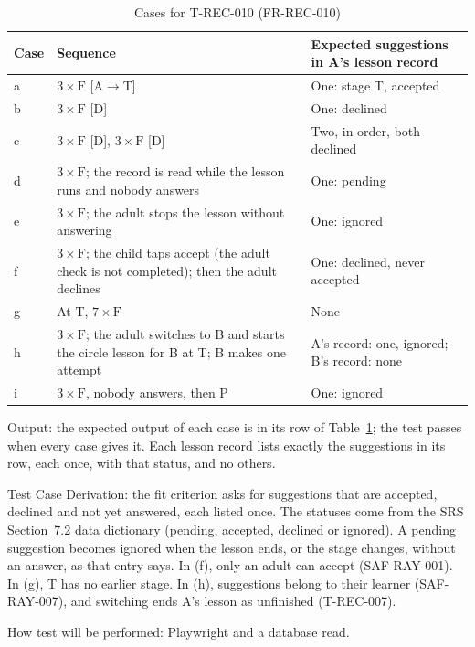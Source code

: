 \documentclass[12pt, titlepage]{article}
\begin{document}
\begin{enumerate}
\begin{table}[htbp]
\centering\small
\caption{Cases for T-REC-010 (FR-REC-010)}
\label{tab:t-rec-010}
\begin{tabularx}{\textwidth}{@{}l >{\raggedright\arraybackslash}X
  >{\raggedright\arraybackslash}X@{}}
\toprule
\textbf{Case} & \textbf{Sequence} &
\textbf{Expected suggestions in A's lesson record}\\
\midrule
a & $3 \times \mathrm{F}$ [A$\to$T] & One: stage T, accepted\\
b & $3 \times \mathrm{F}$ [D] & One: declined\\
c & $3 \times \mathrm{F}$ [D], $3 \times \mathrm{F}$ [D] & Two, in order,
both declined\\
d & $3 \times \mathrm{F}$; the record is read while the lesson runs and
nobody answers & One: pending\\
e & $3 \times \mathrm{F}$; the adult stops the lesson without answering &
One: ignored\\
f & $3 \times \mathrm{F}$; the child taps accept (the adult check is not
completed); then the adult declines & One: declined, never accepted\\
g & At T, $7 \times \mathrm{F}$ & None\\
h & $3 \times \mathrm{F}$; the adult switches to B and starts the circle
lesson for B at T; B makes one attempt & A's record: one, ignored; B's
record: none\\
i & $3 \times \mathrm{F}$, nobody answers, then P & One: ignored\\
\bottomrule
\end{tabularx}
\end{table}

Output: the expected output of each case is in its row of
Table~\ref{tab:t-rec-010}; the test passes when every case gives it. Each
lesson record lists exactly the suggestions in its row, each once, with
that status, and no others.

Test Case Derivation: the fit criterion asks for suggestions that are
accepted, declined and not yet answered, each listed once. The statuses
come from the SRS Section~7.2 data dictionary (pending, accepted, declined
or ignored). A pending suggestion becomes ignored when the lesson ends, or
the stage changes, without an answer, as that entry says. In (f), only an adult can accept (SAF-RAY-001). In (g), T has
no earlier stage. In (h), suggestions belong to their learner
(SAF-RAY-007), and switching ends A's lesson as unfinished (T-REC-007).

How test will be performed: Playwright and a database read.

\end{enumerate}
\end{document}
